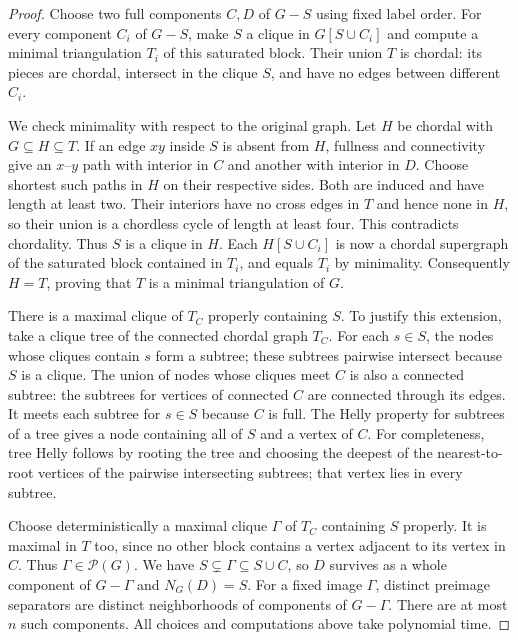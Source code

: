 \documentclass[acmsmall,12pt,screen,nonacm]{acmart}
\newcommand{\PMC}{\mathcal P}
\begin{document}
\begin{proof}
Choose two full components $C,D$ of $G-S$ using fixed label order. For every
component $C_i$ of $G-S$, make $S$ a clique in $G[S\cup C_i]$ and compute a
minimal triangulation $T_i$ of this saturated block. Their union $T$ is
chordal: its pieces are chordal, intersect in the clique $S$, and have no
edges between different $C_i$.

We check minimality with respect to the original graph. Let $H$ be chordal
with $G\subseteq H\subseteq T$. If an edge $xy$ inside $S$ is absent from
$H$, fullness and connectivity give an $x$--$y$ path with interior in $C$
and another with interior in $D$. Choose shortest such paths in $H$ on their
respective sides. Both are induced and have length at least two. Their
interiors have no cross edges in $T$ and hence none in $H$, so their union
is a chordless cycle of length at least four. This contradicts chordality.
Thus $S$ is a clique in $H$. Each $H[S\cup C_i]$ is now a chordal supergraph
of the saturated block contained in $T_i$, and equals $T_i$ by minimality.
Consequently $H=T$, proving that $T$ is a minimal triangulation of $G$.

There is a maximal clique of $T_C$ properly containing $S$. To justify this
extension, take a clique tree of the connected chordal graph $T_C$.
For each $s\in S$, the nodes whose cliques contain $s$ form a subtree;
these subtrees pairwise intersect because $S$ is a clique. The union of nodes
whose cliques meet $C$ is also a connected subtree: the subtrees for vertices
of connected $C$ are connected through its edges. It meets each subtree for
$s\in S$ because $C$ is full. The Helly property for subtrees of a tree gives
a node containing all of $S$ and a vertex of $C$.
For completeness, tree Helly follows by rooting the tree and choosing the
deepest of the nearest-to-root vertices of the pairwise intersecting subtrees;
that vertex lies in every subtree.

Choose deterministically a maximal clique $\Gamma$ of $T_C$ containing $S$
properly. It is maximal in $T$ too, since no other block contains a vertex
adjacent to its vertex in $C$. Thus $\Gamma\in\PMC(G)$.
We have $S\subsetneq\Gamma\subseteq S\cup C$, so $D$ survives as a whole
component of $G-\Gamma$ and $N_G(D)=S$. For a fixed image $\Gamma$, distinct
preimage separators are distinct neighborhoods of components of $G-\Gamma$.
There are at most $n$ such components. All choices and computations above
take polynomial time.
\end{proof}
\end{document}
